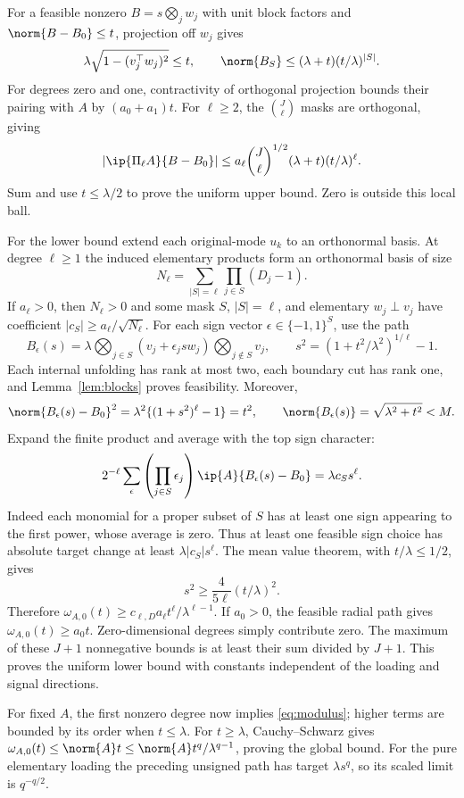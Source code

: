 For a feasible nonzero $B=s\bigotimes_jw_j$ with unit block factors and $\norm{B-B_0}\le t$, projection off $w_j$ gives
\[
 \lambda\sqrt{1-(v_j^\top w_j)^2}\le t,\qquad
 \norm{B_S}\le(\lambda+t)(t/\lambda)^{|S|}.
\]
For degrees zero and one, contractivity of orthogonal projection bounds their pairing with $A$ by $(a_0+a_1)t$. For $\ell\ge2$, the $\binom J\ell$ masks are orthogonal, giving
\[
 |\ip{\Pi_\ell A}{B-B_0}|
 \le a_\ell\binom J\ell^{1/2}(\lambda+t)(t/\lambda)^\ell.
\]
Sum and use $t\le\lambda/2$ to prove the uniform upper bound. Zero is outside this local ball.

For the lower bound extend each original-mode $u_k$ to an orthonormal basis. At degree $\ell\ge1$ the induced elementary products form an orthonormal basis of size
\[
 N_\ell=\sum_{|S|=\ell}\prod_{j\in S}(D_j-1).
\]
If $a_\ell>0$, then $N_\ell>0$ and some mask $S$, $|S|=\ell$, and elementary $w_j\perp v_j$ have coefficient $|c_S|\ge a_\ell/\sqrt{N_\ell}$. For each sign vector $\epsilon\in\{-1,1\}^S$, use the path
\[
 B_\epsilon(s)=\lambda\bigotimes_{j\in S}(v_j+\epsilon_jsw_j)
                         \bigotimes_{j\notin S}v_j,
 \qquad s^2=(1+t^2/\lambda^2)^{1/\ell}-1.
\]
Each internal unfolding has rank at most two, each boundary cut has rank one, and Lemma~\ref{lem:blocks} proves feasibility. Moreover,
\[
 \norm{B_\epsilon(s)-B_0}^2=\lambda^2\{(1+s^2)^\ell-1\}=t^2,
 \qquad \norm{B_\epsilon(s)}=\sqrt{\lambda^2+t^2}<M.
\]
Expand the finite product and average with the top sign character:
\[
 2^{-\ell}\sum_\epsilon\left(\prod_{j\in S}\epsilon_j\right)
       \ip{A}{B_\epsilon(s)-B_0}=\lambda c_Ss^\ell.
\]
Indeed each monomial for a proper subset of $S$ has at least one sign appearing to the first power, whose average is zero. Thus at least one feasible sign choice has absolute target change at least $\lambda|c_S|s^\ell$. The mean value theorem, with $t/\lambda\le1/2$, gives
\[
 s^2\ge\frac{4}{5\ell}(t/\lambda)^2.
\]
Therefore $\omega_{A,0}(t)\ge c_{\ell,D}a_\ell t^\ell/\lambda^{\ell-1}$. If $a_0>0$, the feasible radial path gives $\omega_{A,0}(t)\ge a_0t$. Zero-dimensional degrees simply contribute zero. The maximum of these $J+1$ nonnegative bounds is at least their sum divided by $J+1$. This proves the uniform lower bound with constants independent of the loading and signal directions.

For fixed $A$, the first nonzero degree now implies \eqref{eq:modulus}; higher terms are bounded by its order when $t\le\lambda$. For $t\ge\lambda$, Cauchy--Schwarz gives $\omega_{A,0}(t)\le\norm{A}t\le\norm{A}t^q/\lambda^{q-1}$, proving the global bound. For the pure elementary loading the preceding unsigned path has target $\lambda s^q$, so its scaled limit is $q^{-q/2}$.

